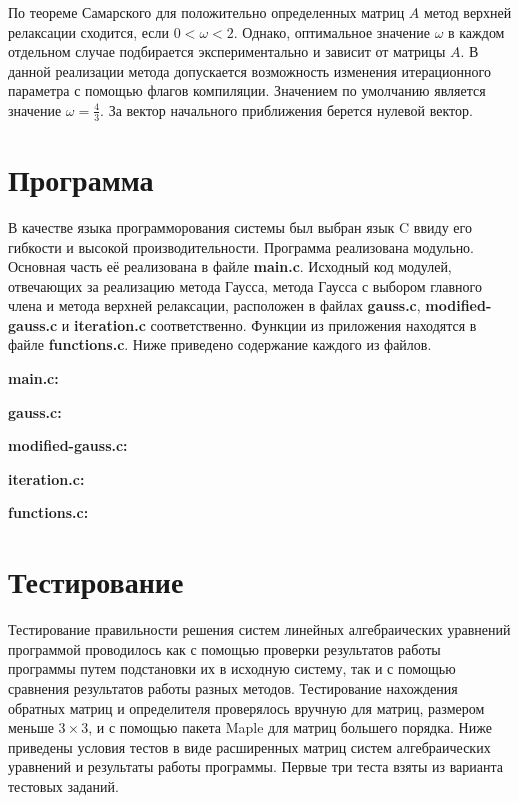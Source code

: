 \documentclass[12pt, a4paper]{report}
\begin{document}
{\normalsize{По теореме Самарского \cite{computational_science} для положительно определенных матриц $A$
            метод верхней релаксации сходится, если $0 < \omega < 2$. Однако, оптимальное значение $\omega$ в каждом отдельном случае
            подбирается экспериментально и зависит от матрицы $A$. В данной реализации метода допускается возможность
            изменения итерационного параметра с помощью флагов компиляции. Значением по умолчанию является значение $\omega = \frac{4}{3}$.
            За вектор начального приближения берется нулевой вектор.}
\newpage



\chapter{Программа}
\normalsize{В качестве языка программорования системы был выбран язык C ввиду его гибкости и высокой производительности. 
            Программа реализована модульно. Основная часть её реализована в файле \textbf{main.c}.
            Исходный код модулей, отвечающих за реализацию метода Гаусса, метода Гаусса с выбором главного члена и
            метода верхней релаксации, расположен в файлах \textbf{gauss.c}, \textbf{modified-gauss.c} и \textbf{iteration.c} соответственно.
            Функции из приложения  находятся в файле \textbf{functions.c}.
            Ниже приведено содержание каждого из файлов.}

\vspace{1cm}
\normalsize{\bfseries main.c:}


\vspace{1cm}
\normalsize{\bfseries gauss.c:}


\vspace{1cm}
\normalsize{\bfseries modified-gauss.c:}


\vspace{1cm}
\normalsize{\bfseries iteration.c:}


\vspace{1cm}
\normalsize{\bfseries functions.c:}


\newpage



\chapter{Тестирование}
\normalsize{Тестирование правильности решения систем линейных алгебраических уравнений программой
            проводилось как с помощью проверки результатов работы программы путем подстановки их 
            в исходную систему, так и с помощью сравнения результатов работы разных методов. Тестирование
            нахождения обратных матриц и определителя проверялось вручную для матриц, размером меньше
            $3 \times 3$, и с помощью пакета Maple для матриц большего порядка.}
\normalsize{Ниже приведены условия тестов в виде расширенных матриц систем алгебраических уравнений и результаты работы программы.
            Первые три теста взяты из варианта  тестовых заданий.}

}
\end{document}
